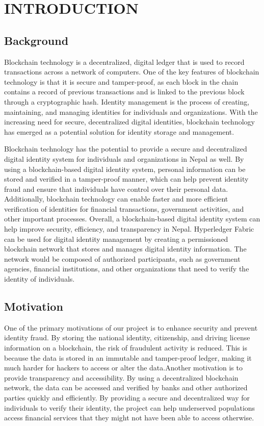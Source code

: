 \chapter{INTRODUCTION}




\section{Background}
Blockchain technology is a decentralized, digital ledger that is used to record transactions across a network of computers. One of the key features of blockchain technology is that it is secure and tamper-proof, as each block in the chain contains a record of previous transactions and is linked to the previous block through a cryptographic hash. Identity management is the process of creating, maintaining, and managing identities for individuals and organizations. With the increasing need for secure, decentralized digital identities, blockchain technology has emerged as a potential solution for identity storage and management. 

Blockchain technology has the potential to provide a secure and decentralized digital identity system for individuals and organizations in Nepal as well. By using a blockchain-based digital identity system, personal information can be stored and verified in a tamper-proof manner, which can help prevent identity fraud and ensure that individuals have control over their personal data. Additionally, blockchain technology can enable faster and more efficient verification of identities for financial transactions, government activities, and other important processes. Overall, a blockchain-based digital identity system can help improve security, efficiency, and transparency in Nepal. Hyperledger Fabric can be used for digital identity management by creating a permissioned blockchain network that stores and manages digital identity information. The network would be composed of authorized participants, such as government agencies, financial institutions, and other organizations that need to verify the identity of individuals.

\section{Motivation}
One of the primary motivations of our project is to enhance security and prevent identity fraud. By storing the national identity, citizenship, and driving license information on a blockchain, the risk of fraudulent activity is reduced. This is because the data is stored in an immutable and tamper-proof ledger, making it much harder for hackers to access or alter the data.Another motivation is to provide transparency and accessibility. By using a decentralized blockchain network, the data can be accessed and verified by banks and other authorized parties quickly and efficiently. By providing a secure and decentralized way for individuals to verify their identity, the project can help underserved populations access financial services that they might not have been able to access otherwise.

